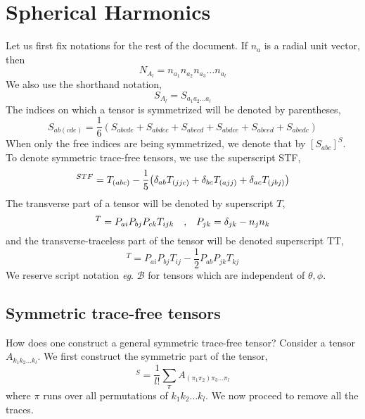 \documentclass[a4paper,11pt]{article}
\begin{document}
\section{Spherical Harmonics}
Let us first fix notations for the rest of the document. If $ n_a $ is a radial unit vector, then
\begin{equation*}
N_{A_l}  = n_{a_1} n_{a_2} n_{a_3} \ldots n_{a_l}
\end{equation*}
We also use the shorthand notation,
\begin{equation*}
S_{A_l} = S_{a_1 a_2 \ldots a_l}
\end{equation*}
The indices on which a tensor is symmetrized will be denoted by parentheses,
\begin{equation*}
S_{ab(cde)} = \dfrac{1}{6}(S_{abcde} + S_{abdec} + S_{abecd} + S_{abdce} + S_{abced} +  S_{abedc})
\end{equation*}
When only the free indices are being symmetrized, we denote that by $ [S_{abc}]^S $. To denote symmetric trace-free tensors, we use the superscript STF,
\begin{equation*}
[T_{abc}]^{STF}= T_{(abc)} - \dfrac{1}{5} \qty(\delta_{ab} T_{(jjc)} + \delta_{bc} T_{(ajj)} + \delta_{ac} T_{(jbj)} )
\end{equation*}
The transverse part of a tensor will be denoted by superscript $ T $,
\begin{equation*}
[T_{abc}]^T = P_{ai} P_{bj} P_{ck} T_{ijk} \qq{,} P_{jk} = \delta_{jk} - n_j n_k
\end{equation*}
and the transverse-traceless part of the tensor will be denoted superscript TT,
\begin{equation*}
[T_{ab}]^T = P_{ai} P_{bj} T_{ij} - \dfrac{1}{2} P_{ab} P_{jk } T_{kj} 
\end{equation*}
We reserve script notation \textit{eg}. $ \mathcal{B} $ for tensors which are independent of $ \theta, \phi $.
\subsection{Symmetric trace-free tensors}
How does one construct a general symmetric trace-free tensor? Consider a tensor $ A_{k_1 k_2 \ldots k_l	} $. We first construct the symmetric part of the tensor,
\begin{equation*}
[A_{k_1 k_2 \ldots k_l	}]^S = \dfrac{1}{l!}\sum_{\pi} A_{(\pi_1 \pi_2) \pi_3 \ldots \pi_l}  
\end{equation*}
where $ \pi $ runs over all permutations of $k_1 k_2 \ldots k_l  $. We now proceed to remove all the traces. 
\end{document}
